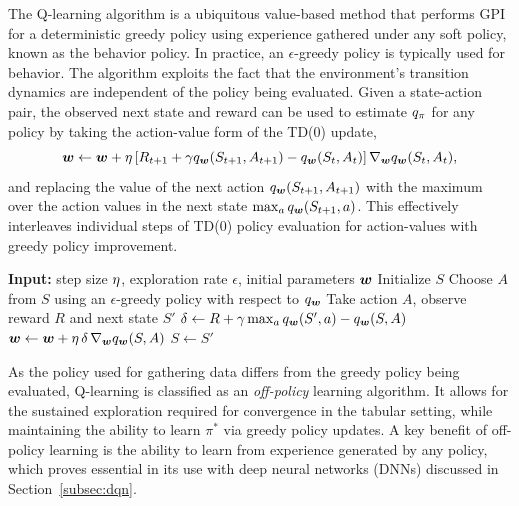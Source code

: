   The Q-learning algorithm  is a ubiquitous value-based method that performs GPI for a deterministic greedy policy using experience gathered under any soft policy, known as the behavior policy. In practice, an $\epsilon$-greedy policy is typically used for behavior. The algorithm 
  exploits the fact that the environment's transition dynamics are independent of the policy being evaluated. Given a state-action pair, the observed next state and reward can be used to estimate $q_{\pi}$ for any policy by taking the action-value form of the TD(0) update,
  \begin{equation}
      {\bm w} \gets {\bm w} + \eta \left[ R_{t+1} + \gamma q_{\bm w}(S_{t+1}, A_{t+1}) - q_{\bm w}(S_t, A_t) \right] \nabla_{{\bm w}} q_{\bm w}(S_t, A_t),
      \label{eq:td_update_q}
  \end{equation}
  and replacing the value of the next action $q_{\bm w}(S_{t+1}, A_{t+1})$
  with the maximum over the action values in the next state $\max_{a} q_{\bm w}(S_{t+1}, a)$.
  This effectively interleaves individual steps of TD(0) policy evaluation for action-values with greedy policy improvement.
  
  \begin{algorithm}[t]
  \caption{Q-learning}
  \label{alg:qlearning}
  \begin{algorithmic}[1]
  \State \textbf{Input:} step size $\eta$, exploration rate $\epsilon$, initial parameters ${\bm w}$
      \State Initialize $S$
          \State Choose $A$ from $S$ using an $\epsilon$-greedy policy with respect to $q_{\bm w}$
          \State Take action $A$, observe reward $R$ and next state $S'$
          \State $\delta \gets R + \gamma \max_{a} q_{\bm w}(S', a) - q_{\bm w}(S, A)$ 
          \State ${\bm w} \gets {\bm w} + \eta\, \delta\, \nabla_{{\bm w}} q_{\bm w}(S, A)$
          \State $S \gets S'$
      \EndWhile
  \EndFor
  \end{algorithmic}
  \end{algorithm}
  
  As the policy used for gathering data differs from the greedy policy being evaluated, Q-learning is classified as an \textit{off-policy} learning algorithm. It allows for the sustained exploration required for convergence in the tabular setting, while maintaining the ability to learn $\pi^*$ via greedy policy updates. A key benefit of off-policy learning is the ability to learn from experience generated by any policy, which proves essential in its use with deep neural networks (DNNs) discussed in Section~\ref{subsec:dqn}. 
  
